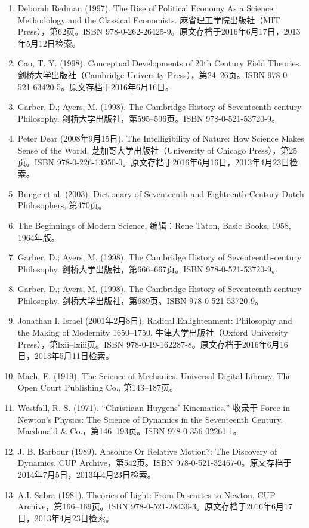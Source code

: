 \begin{enumerate}
\item Deborah Redman (1997). The Rise of Political Economy As a Science: Methodology and the Classical Economists. 麻省理工学院出版社（MIT Press），第62页。ISBN 978-0-262-26425-9。原文存档于2016年6月17日，2013年5月12日检索。
\item Cao, T. Y. (1998). Conceptual Developments of 20th Century Field Theories. 剑桥大学出版社（Cambridge University Press），第24–26页。ISBN 978-0-521-63420-5。原文存档于2016年6月16日。
\item Garber, D.; Ayers, M. (1998). The Cambridge History of Seventeenth-century Philosophy. 剑桥大学出版社，第595–596页。ISBN 978-0-521-53720-9。
\item Peter Dear (2008年9月15日). The Intelligibility of Nature: How Science Makes Sense of the World. 芝加哥大学出版社（University of Chicago Press），第25页。ISBN 978-0-226-13950-0。原文存档于2016年6月16日，2013年4月23日检索。
\item Bunge et al. (2003). Dictionary of Seventeenth and Eighteenth-Century Dutch Philosophers, 第470页。
\item The Beginnings of Modern Science, 编辑：Rene Taton, Basic Books, 1958, 1964年版。
\item Garber, D.; Ayers, M. (1998). The Cambridge History of Seventeenth-century Philosophy. 剑桥大学出版社，第666–667页。ISBN 978-0-521-53720-9。
\item Garber, D.; Ayers, M. (1998). The Cambridge History of Seventeenth-century Philosophy. 剑桥大学出版社，第689页。ISBN 978-0-521-53720-9。
\item Jonathan I. Israel (2001年2月8日). Radical Enlightenment: Philosophy and the Making of Modernity 1650–1750. 牛津大学出版社（Oxford University Press），第lxii–lxiii页。ISBN 978-0-19-162287-8。原文存档于2016年6月16日，2013年5月11日检索。
\item Mach, E. (1919). The Science of Mechanics. Universal Digital Library. The Open Court Publishing Co., 第143–187页。
\item Westfall, R. S. (1971). “Christiaan Huygens' Kinematics,” 收录于 Force in Newton's Physics: The Science of Dynamics in the Seventeenth Century. Macdonald & Co.，第146–193页。ISBN 978-0-356-02261-1。
\item J. B. Barbour (1989). Absolute Or Relative Motion?: The Discovery of Dynamics. CUP Archive，第542页。ISBN 978-0-521-32467-0。原文存档于2014年7月5日，2013年4月23日检索。
\item A.I. Sabra (1981). Theories of Light: From Descartes to Newton. CUP Archive，第166–169页。ISBN 978-0-521-28436-3。原文存档于2016年6月17日，2013年4月23日检索。

\end{enumerate}
